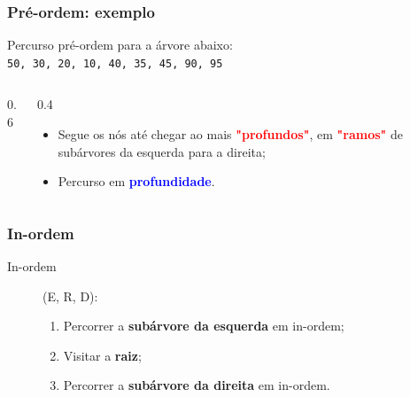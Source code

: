 \documentclass{beamer}
\newcommand{\tcb}[1]{\textcolor{blue}{\textbf{#1}}}
\newcommand{\tcr}[1]{\textcolor{red}{\textbf{#1}}}
\begin{document}
\begin{frame}
  \frametitle{Pré-ordem: exemplo}

  Percurso pré-ordem para a árvore abaixo:\\
  \texttt{50, 30, 20, 10, 40, 35, 45, 90, 95}
  
  \vspace{1cm}

  \begin{columns}
    \begin{column}{0.6\textwidth}

      \centering
    \end{column}
    \begin{column}{0.4\textwidth}
      \begin{itemize}
        \item Segue os nós até chegar ao mais \tcr{"profundos"}, em \tcr{"ramos"} de subárvores da esquerda para a direita;
        \item Percurso em \tcb{profundidade}.
      \end{itemize}
    \end{column}
  \end{columns}

\end{frame}

\begin{frame}
  \frametitle{In-ordem}

  \begin{description}
    \item [In-ordem] (E, R, D):
    \begin{enumerate}
      \item Percorrer a \textbf{subárvore da esquerda} em in-ordem;
      \item Visitar a \textbf{raiz};
      \item Percorrer a \textbf{subárvore da direita} em in-ordem.
    \end{enumerate}
  \end{description}
  
\end{frame}
\end{document}
